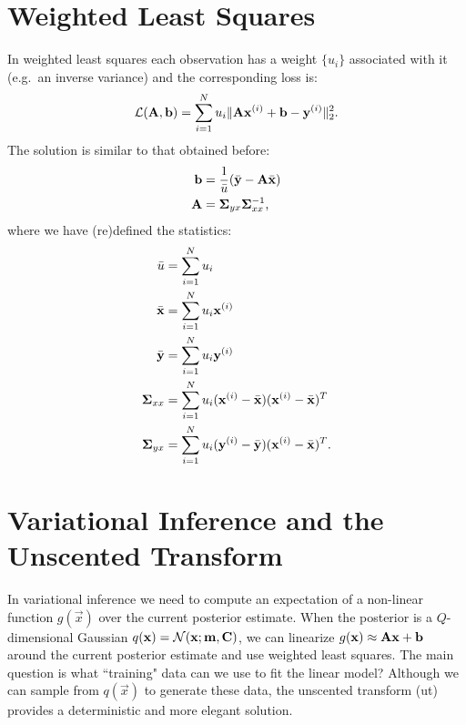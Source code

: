 \documentclass[11pt,a4paper]{article}
\newcommand{\ut}{{\sc ut}\xspace}
\newcommand{\x}{\vec{x}}
\newcommand{\y}{\vec{y}}
\renewcommand{\xi}{\x^{(i)}}
\newcommand{\yi}{\y^{(i)}}
\renewcommand{\b}{\vec{b}}
\newcommand{\xbar}{\bar{\x}}
\newcommand{\ybar}{\bar{\y}}
\newcommand{\Sigmaxx}{\mat{\Sigma}_{xx}}
\newcommand{\Sigmayx}{\mat{\Sigma}_{yx}}
\newcommand{\loss}{\calL(\A,\b)}
\newcommand{\w}{u}
\newcommand{\wi}{u_i}
\newcommand{\wbar}{\bar{\w}}
\newcommand{\qx}{q(\x)}
\newcommand{\m}{\vec{m}}
\renewcommand{\Q}{Q}
\begin{document}
\section{Weighted Least Squares}
In weighted least squares each observation has a weight $\{ \wi \}$ associated with it (e.g.~an inverse
variance) and the corresponding loss is:
\begin{equation}
	 \loss  = \sum_{i=1}^N \w_i  \norm{\A \xi + \b - \yi }_2^2  \text{.}
\end{equation}
The solution is similar to that obtained before:
\begin{align}
	\label{eq:b-w}
	\b & = \frac{1}{\wbar} (\ybar - \A \xbar) \\
	\label{eq:A-w}	
	\A & = \Sigmayx \Sigmaxx^{-1} \text{,}
\end{align}
where we have (re)defined the statistics:
\begin{align}
	\wbar & = \sum_{i=1}^N \wi\\	
	\xbar & =  \sum_{i=1}^N \wi \xi \\
	\ybar & =  \sum_{i=1}^N \wi \yi \\
	\label{eq:Sigmaxx-w}
	\Sigmaxx & = \sum_{i=1}^N \wi (\xi - \xbar) (\xi - \xbar)^T \\
	\label{eq:Sigmayx-w}
	\Sigmayx & = \sum_{i=1}^N \wi (\yi - \ybar) (\xi - \xbar)^T \text{.}
\end{align}
\section{Variational Inference and the Unscented Transform}
In variational inference we need to compute an expectation of a non-linear 
function $g(\x)$ over the current posterior estimate. When the  
posterior is a $\Q$-dimensional Gaussian $\qx = \Normal(\x; \m, \C)$, we can linearize 
$g(\x) \approx \A \x + \b$ around the current posterior estimate 
and use weighted least squares. The main question 
is what ``training" data  can we use to fit the linear model? Although we can 
sample from $\qx$ to generate these data, the unscented transform (\ut) provides 
a deterministic and more  elegant solution. 
\end{document}
